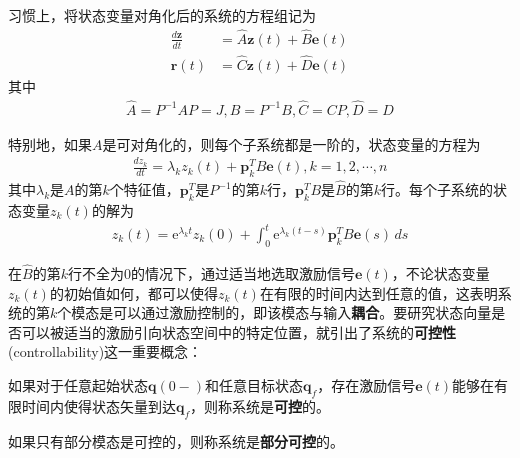 习惯上，将状态变量对角化后的系统的方程组记为\begin{align*}
    \frac{d\mathbf{z}}{dt}&=\hat{A}\mathbf{z}(t)+\hat{B}\mathbf{e}(t)\\
    \mathbf{r}(t)&=\hat{C}\mathbf{z}(t)+\hat{D}\mathbf{e}(t)
\end{align*}
其中\begin{align*}
    \hat{A}=P^{-1}AP=J,\hat{B}=P^{-1}B,\hat{C}=CP,\hat{D}=D
\end{align*}

特别地，如果$A$是可对角化的，则每个子系统都是一阶的，状态变量的方程为\begin{align*}
    \frac{dz_k}{dt}=\lambda_k z_k(t)+\mathbf{p}_k^T B\mathbf{e}(t),k=1,2,\cdots,n
\end{align*}
其中$\lambda_k$是$A$的第$k$个特征值，$\mathbf{p}_k^T$是$P^{-1}$的第$k$行，$\mathbf{p}_k^T B$是$\hat{B}$的第$k$行。每个子系统的状态变量$z_k(t)$的解为\begin{align*}
    z_k(t)=\mathrm{e}^{\lambda_k t}z_k(0)+\int_0^t \mathrm{e}^{\lambda_k (t-s)}\mathbf{p}_k^TB\mathbf{e}(s)\,ds
\end{align*}

在$\hat{B}$的第$k$行不全为0的情况下，通过适当地选取激励信号$\mathbf{e}(t)$，不论状态变量$z_k(t)$的初始值如何，都可以使得$z_k(t)$在有限的时间内达到任意的值，这表明系统的第$k$个模态是可以通过激励控制的，即该模态与输入\textbf{耦合}。要研究状态向量是否可以被适当的激励引向状态空间中的特定位置，就引出了系统的\textbf{可控性}(controllability)这一重要概念：

\begin{definition}[可控性]
    如果对于任意起始状态$\mathbf{q}(0-)$和任意目标状态$\mathbf{q}_f$，存在激励信号$\mathbf{e}(t)$能够在有限时间内使得状态矢量到达$\mathbf{q}_f$，则称系统是\textbf{可控}的。

    如果只有部分模态是可控的，则称系统是\textbf{部分可控}的。
\end{definition}

